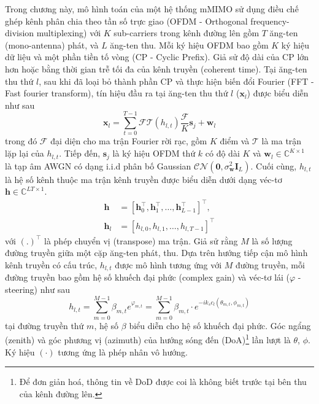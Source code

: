Trong chương này, mô hình toán của một hệ thống mMIMO sử dụng điều chế ghép kênh phân chia theo tần số trực giao (OFDM - Orthogonal frequency-division multiplexing) với $K$ sub-carriers trong kênh đường lên gồm $T$ ăng-ten (mono-antenna) phát, và $L$ ăng-ten thu. Mỗi ký hiệu OFDM bao gồm $K$ ký hiệu dữ liệu và một phần tiền tố vòng (CP - Cyclic Prefix). Giả sử độ dài của CP lớn hơn hoặc bằng thời gian trễ tối đa của kênh truyền (coherent time). Tại ăng-ten thu thứ $l$, sau khi đã loại bỏ thành phần CP và thực hiện biến đổi Fourier (FFT - Fast fourier transform), tín hiệu đầu ra tại ăng-ten thu thứ $l$ ($\mathbf{x}_l$) được biểu diễn như sau~\cite{Ladaycia2017}
\begin{equation}
    \mathbf{x}_{l}=\sum_{t=0}^{T-1} \mathcal{F} \mathcal{T}\left(h_{l, t}\right) \frac{\mathcal{F}}{K} \mathbf{s}_{j}+\mathbf{w}_{l}
\end{equation}
trong đó $\mathcal{F}$ đại diện cho ma trận Fourier rời rạc, gồm $K$ điểm và $\mathcal{T}$ là ma trận lặp lại của $h_{l, t}$. Tiếp đến, $\mathbf{s}_{j}$ là ký hiệu OFDM thứ $k$ có độ dài $K$ và $\mathbf{w}_{l} \in \mathbb{C}^{K \times 1}$ là tạp âm AWGN có dạng i.i.d phân bố Gaussian $\mathcal{C} \mathcal{N}\left(\mathbf{0}, \sigma_{\mathbf{w}}^{2} \mathbf{I}_L\right)$. 
Cuối cùng, $h_{l, t}$ là hệ số kênh thuộc ma trận kênh truyền được biểu diễn dưới dạng véc-tơ $\mathbf{h} \in \mathbb{C}^{L T \times 1}$.
\begin{equation}
    \label{eq:1}
    \begin{aligned} 
        \mathbf{h} &=\left[\mathbf{h}_{0}^{\top}, \mathbf{h}_{1}^{\top}, \ldots, \mathbf{h}_{L - 1 }^{\top}\right]^{\top}, \\ \mathbf{h}_{l} &=\left[h_{l, 0}, h_{l, 1}, \ldots, h_{l, T - 1 }\right]^{\top}
    \end{aligned}
\end{equation}
với $(.)^\top$ là phép chuyển vị (transpose) ma trận. Giả sử rằng $M$ là số lượng đường truyền giữa một cặp ăng-ten phát, thu. Dựa trên hướng tiếp cận mô hình kênh truyền có cấu trúc, $h_{l, t}$ được mô hình tương ứng với $M$ đường truyền, mỗi đường truyền bao gồm hệ số khuếch đại phức (complex gain) và véc-tơ lái ($\varphi$ - steering) như sau
\begin{equation}
\label{eq:2}
        h_{l, t} = \sum\limits_{m=0}^{M-1} \beta_{m, t} e^{\varphi_{m, t}} = \sum\limits_{m=0}^{M-1} \beta_{m, t} \cdot e^{-i k_s c_l(\theta_{m, t}, \phi_{m, t})} 
\end{equation}
tại đường truyền thứ $m$, hệ số $\beta$ biểu diễn cho hệ số khuếch đại phức. Góc ngẩng (zenith) và góc phương vị (azimuth) của hướng sóng đến (DoA)\footnote{Để đơn giản hoá, thông tin về DoD được coi là không biết trước tại bên thu của kênh đường lên.} lần lượt là  $\theta$, $\phi$. Ký hiệu $(\cdot)$ tương ứng là phép nhân vô hướng.

